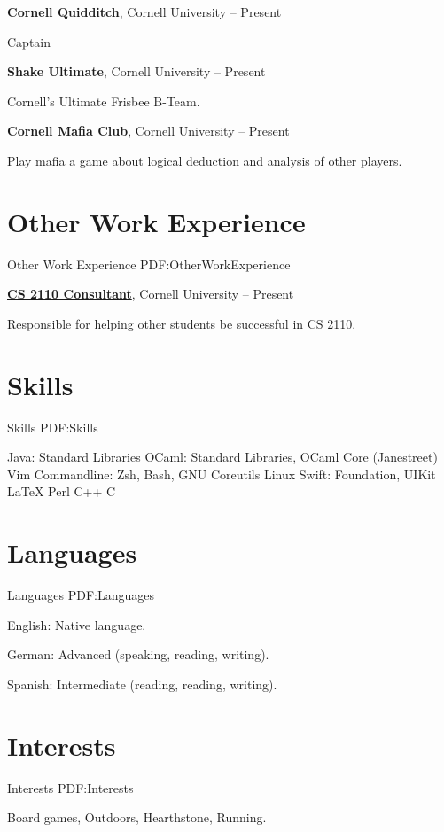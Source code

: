\documentclass[letterpaper,10pt,oneside]{simpleresumecv}
\newcommand{\CVNote}{Resume compiled on {\today} for Apple}
\begin{document}
\begin{body}
{\textbf{Cornell Quidditch}},
Cornell University
\hfill
{} --
Present

\GapNoBreak%
\BulletItem%
Captain

{\textbf{Shake Ultimate}},
Cornell University
\hfill
{} --
Present

\GapNoBreak%
\BulletItem%
Cornell's Ultimate Frisbee B-Team.

{\textbf{Cornell Mafia Club}},
Cornell University
\hfill
{} --
Present

\GapNoBreak%
\BulletItem%
Play mafia a game about logical deduction and analysis of other players.


\section%
{Other Work\newline
Experience}
{Other Work Experience}
{PDF:OtherWorkExperience}

\href{http://www.example.com/my-company}
{\textbf{CS 2110 Consultant}},
Cornell University
\hfill
{} --
Present

\GapNoBreak%
\BulletItem%
Responsible for helping other students be successful in CS 2110.


\section%
{Skills}
{Skills}
{PDF:Skills}

\BulletItem%
Java: Standard Libraries
\BulletItem%
OCaml: Standard Libraries, OCaml Core (Janestreet)
\BulletItem%
Vim
\BulletItem%
Commandline: Zsh, Bash, GNU Coreutils
\BulletItem%
Linux
\BulletItem%
Swift: Foundation, UIKit
\BulletItem%
{\LaTeX}
\BulletItem%
Perl
\BulletItem%
C++
\BulletItem%
C


\section%
{Languages}
{Languages}
{PDF:Languages}

\BulletItem%
English: Native language.

\GapNoBreak%
\BulletItem%
German: Advanced (speaking, reading, writing).

\GapNoBreak%
\BulletItem%
Spanish: Intermediate (reading, reading, writing).


\section%
{Interests}
{Interests}
{PDF:Interests}

Board games,
Outdoors,
Hearthstone,
Running.

\end{body}


\label{LastPage}~%
\end{document}
